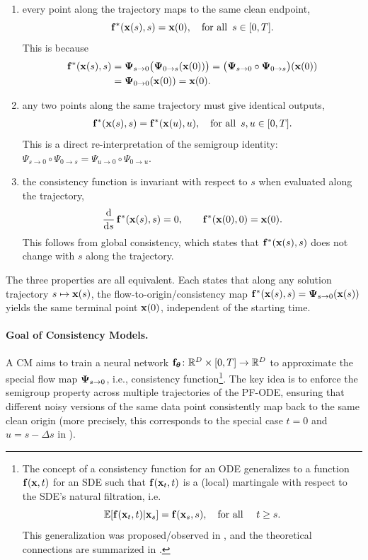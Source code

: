 \begin{enumerate}
    \item[(i)]  every point along the trajectory maps to the same clean endpoint,
    \[
       {\mathbf{f}}^*({\mathbf{x}}(s), s) = {\mathbf{x}}(0), \quad \text{for all }\, s \in [0,T].
    \]
    This is because 
\begin{align*}
{\mathbf{f}}^*({\mathbf{x}}(s),s)
&= {\bm{\Psi}}_{s\to 0}\big({\bm{\Psi}}_{0\to s}({\mathbf{x}}(0))\big)
= \big({\bm{\Psi}}_{s\to 0}\circ {\bm{\Psi}}_{0\to s}\big)({\mathbf{x}}(0))
\\&= {\bm{\Psi}}_{0\to 0}({\mathbf{x}}(0))
= {\mathbf{x}}(0).
\end{align*}
    \item[(ii)]  any two points along the same trajectory must give identical outputs,
    \begin{align}\label{eq:cm-self-consistency}
       {\mathbf{f}}^*({\mathbf{x}}(s), s) = {\mathbf{f}}^*({\mathbf{x}}(u), u), \quad \text{for all }\, s, u \in [0,T].
    \end{align}
    This is a direct re-interpretation of the semigroup identity: $\Psi_{s\rightarrow 0}\circ\Psi_{0\rightarrow s}=\Psi_{u\rightarrow 0}\circ\Psi_{0\rightarrow u}$.
    \item[(iii)]  the consistency function is invariant with respect to $s$ when evaluated along the trajectory,
    \begin{align}\label{eq:cm-diff}
        \frac{\mathop{}\!\mathrm{d}}{\mathop{}\!\mathrm{d} s}\,{\mathbf{f}}^*({\mathbf{x}}(s),s) = 0,
        \qquad {\mathbf{f}}^*({\mathbf{x}}(0),0) = {\mathbf{x}}(0).
    \end{align}
This follows from global consistency, which states that ${\mathbf{f}}^*({\mathbf{x}}(s), s)$ does
not change with $s$ along the trajectory.
\end{enumerate}
The three properties are all equivalent. Each states that along any solution trajectory $s\mapsto {\mathbf{x}}(s)$,
the flow-to-origin/consistency map ${\mathbf{f}}^*({\mathbf{x}}(s),s)={\bm{\Psi}}_{s\to 0}({\mathbf{x}}(s))$
yields the same terminal point ${\mathbf{x}}(0)$, independent of the starting time.


\paragraph{Goal of Consistency Models.}
A CM aims to train a neural network 
${\mathbf{f}}_{\bm{\theta}} \colon \mathbb{R}^D \times [0,T] \to \mathbb{R}^D$ 
to approximate the special flow map ${\bm{\Psi}}_{s\to 0}$, i.e., consistency function\footnote{The concept of a consistency function for an ODE generalizes to a function
${\mathbf{f}}({\mathbf{x}},t)$ for an SDE such that ${\mathbf{f}}({\mathbf{x}}_t,t)$ is a (local) martingale with
respect to the SDE’s natural filtration, i.e.
\[
\mathbb{E}[{\mathbf{f}}({\mathbf{x}}_t,t)|{\mathbf{x}}_s]={\mathbf{f}}({\mathbf{x}}_s,s),\quad\text{for all }\quad t\ge s.
\]
This generalization was proposed/observed in \citep{daras2023consistent,lai2023fp},
and the theoretical connections are summarized in \citep{lai2023equivalence}.}. 
The key idea is to enforce the semigroup property across multiple trajectories of the PF-ODE, ensuring that different noisy versions of the same data point consistently map back to the same clean origin (more precisely, this corresponds to the special case $t=0$ and $u=s-\Delta s$ in ).

